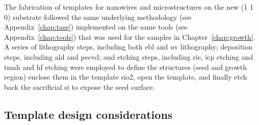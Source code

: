 The fabrication of templates for nanowires and microstructures on the new \hkl(1 1 0) substrate followed the same underlying methodology (see Appendix~\ref{chap:tase}) implemented on the same tools (see Appendix~\ref{chap:tools}) that was used for the samples in Chapter~\ref{chap:growth}. A series of lithography steps, including both \acf{ebl} and uv lithography; deposition steps, including \acf{ald} and \acf{pecvd}; and etching steps, including \acf{rie}, \acf{icp} etching and \acf{tmah} and \acf{hf} etching were employed to define the structures (seed and growth region) enclose them in the template \acs{sio2}, open the template, and finally etch back the sacrificial \acs{si} to expose the seed surface.

\subsection{Template design considerations}


